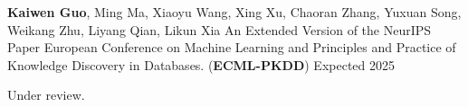 


\newcommand{\papersaddspace}[0]{
  \vspace{5.5mm}
}



\begin{cventries}

  \cventry
  {\textbf{Kaiwen Guo}, Ming Ma, Xiaoyu Wang, Xing Xu, Chaoran Zhang, Yuxuan Song, Weikang Zhu, Liyang Qian, Likun Xia} %
  {An Extended Version of the NeurIPS Paper} %
  {European Conference on Machine Learning and Principles and Practice of Knowledge Discovery in Databases. (\textbf{ECML-PKDD})} %
  {Expected 2025} %
  {
    \begin{cvitems}
      \item{Under review.}
    \end{cvitems}
  }
  \papersaddspace


\end{cventries}
